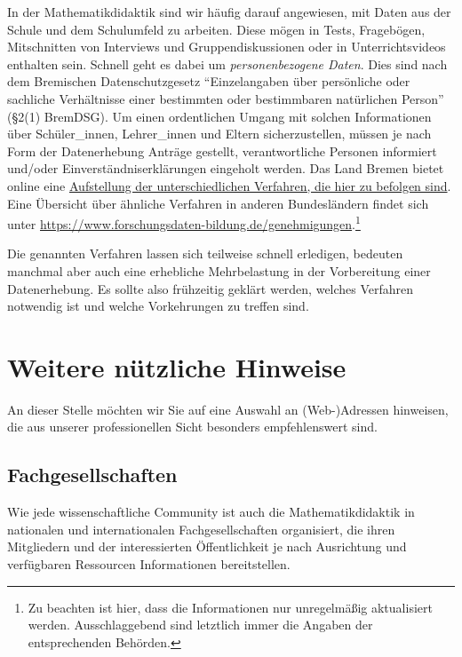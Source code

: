 \documentclass[
  bibliography=totoc,
  oneside,
  12pt,
  a4paper]{scrbook}
\begin{document}
In der Mathematikdidaktik sind wir häufig darauf angewiesen, mit Daten
aus der Schule und dem Schulumfeld zu arbeiten. Diese mögen in Tests,
Fragebögen, Mitschnitten von Interviews und Gruppendiskussionen oder in
Unterrichtsvideos enthalten sein. Schnell geht es dabei um
\emph{personenbezogene Daten}. Dies sind nach dem Bremischen
Datenschutzgesetz ``Einzelangaben über persönliche oder sachliche
Verhältnisse einer bestimmten oder bestimmbaren natürlichen Person''
(§2(1) BremDSG). Um einen ordentlichen Umgang mit solchen Informationen
über Schüler\_innen, Lehrer\_innen und Eltern sicherzustellen, müssen je
nach Form der Datenerhebung Anträge gestellt, verantwortliche Personen
informiert und/oder Einverständniserklärungen eingeholt werden. Das Land Bremen bietet online eine \href{https://www.bildung.bremen.de/sixcms/detail.php?gsid=bremen117.c.5312.de}{Aufstellung der unterschiedlichen Verfahren, die hier zu
befolgen sind}.
Eine Übersicht über ähnliche Verfahren in anderen Bundesländern findet
sich unter \url{https://www.forschungsdaten-bildung.de/genehmigungen}.\footnote{Zu beachten ist hier, dass die Informationen nur unregelmäßig
  aktualisiert werden. Ausschlaggebend sind letztlich immer die
  Angaben der entsprechenden Behörden.}

Die genannten Verfahren lassen sich teilweise schnell erledigen,
bedeuten manchmal aber auch eine erhebliche Mehrbelastung in der
Vorbereitung einer Datenerhebung. Es sollte also frühzeitig geklärt
werden, welches Verfahren notwendig ist und welche Vorkehrungen zu
treffen sind.

\hypertarget{weitere-nuxfctzliche-hinweise}{%
\chapter{Weitere nützliche Hinweise}\label{weitere-nuxfctzliche-hinweise}}

An dieser Stelle möchten wir Sie auf eine Auswahl an (Web-)Adressen
hinweisen, die aus unserer professionellen Sicht besonders
empfehlenswert sind.

\hypertarget{fachgesellschaften}{%
\section{Fachgesellschaften}\label{fachgesellschaften}}

Wie jede wissenschaftliche Community ist auch die Mathematikdidaktik in
nationalen und internationalen Fachgesellschaften organisiert, die ihren
Mitgliedern und der interessierten Öffentlichkeit je nach Ausrichtung
und verfügbaren Ressourcen Informationen bereitstellen.
\end{document}
